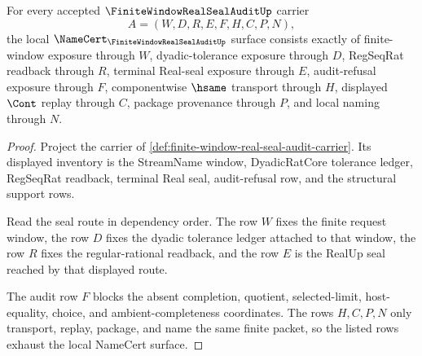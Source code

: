 \begin{theorem}
\label{thm:finite-window-real-seal-audit-namecert-obligations}
For every accepted $\FiniteWindowRealSealAuditUp$ carrier
$$
A=(W,D,R,E,F,H,C,P,N),
$$
the local $\NameCert_{\FiniteWindowRealSealAuditUp}$ surface consists exactly of finite-window exposure through $W$, dyadic-tolerance exposure through $D$, RegSeqRat readback through $R$, terminal Real-seal exposure through $E$, audit-refusal exposure through $F$, componentwise $\hsame$ transport through $H$, displayed $\Cont$ replay through $C$, package provenance through $P$, and local naming through $N$.
\end{theorem}
\begin{proof}
Project the carrier of \autoref{def:finite-window-real-seal-audit-carrier}. Its displayed inventory is the StreamName window, DyadicRatCore tolerance ledger, RegSeqRat readback, terminal Real seal, audit-refusal row, and the structural support rows.

Read the seal route in dependency order. The row $W$ fixes the finite request window, the row $D$ fixes the dyadic tolerance ledger attached to that window, the row $R$ fixes the regular-rational readback, and the row $E$ is the RealUp seal reached by that displayed route.

The audit row $F$ blocks the absent completion, quotient, selected-limit, host-equality, choice, and ambient-completeness coordinates. The rows $H,C,P,N$ only transport, replay, package, and name the same finite packet, so the listed rows exhaust the local NameCert surface.
\end{proof}

